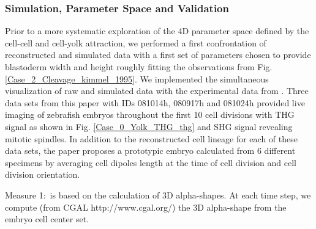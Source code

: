 \subsubsection{Simulation, Parameter Space and Validation }

  Prior to a more systematic exploration of the 4D parameter space defined by the cell-cell and cell-yolk attraction, we performed a first confrontation of reconstructed and simulated data with a first set of parameters chosen to provide blastoderm width and height roughly fitting the observations from Fig. \ref{Case_2_Cleavage_kimmel_1995}. We implemented the simultaneous visualization of raw and simulated data with the experimental data from \cite{Olivier:2010jz}. Three data sets from this paper with IDs 081014h, 080917h and 081024h provided live imaging of zebrafish embryos throughout the first 10 cell divisions with THG signal as shown in Fig. \ref{Case_0_Yolk_THG_thg} and SHG signal revealing mitotic spindles. In addition to the reconstructed cell lineage for each of these data sets, the paper proposes a prototypic embryo calculated from 6 different specimens by averaging cell dipoles length at the time of cell division and cell division orientation.   


  Measure 1: is based on the calculation of 3D alpha-shapes. At each time step, we compute (from CGAL http://www.cgal.org/) the 3D alpha-shape from the embryo cell center set. 

